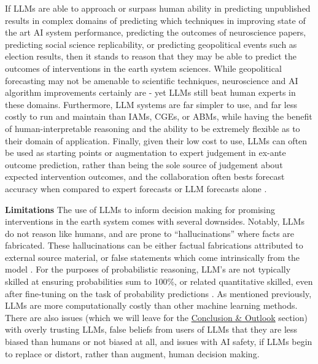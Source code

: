 \documentclass[12pt,a4paper]{article}
\begin{document}
If LLMs are able to approach or surpass human ability in predicting unpublished results in complex domains of predicting which techniques in improving state of the art AI system performance, predicting the outcomes of neuroscience papers, predicting social science replicability, or predicting geopolitical events such as election results, then it stands to reason that they may be able to predict the outcomes of interventions in the earth system sciences. While geopolitical forecasting may not be amenable to scientific techniques, neuroscience and AI algorithm improvements certainly are - yet LLMs still beat human experts in these domains. Furthermore, LLM systems are far simpler to use, and far less costly to run and maintain than IAMs, CGEs, or ABMs, while having the benefit of human-interpretable reasoning and the ability to be extremely flexible as to their domain of application. Finally, given their low cost to use, LLMs can often be used as starting points or augmentation to expert judgement in ex-ante outcome prediction, rather than being the sole source of judgement about expected intervention outcomes, and the collaboration often bests forecast accuracy when compared to expert forecasts or LLM forecasts alone  .

\textbf{Limitations}
The use of LLMs to inform decision making for promising interventions in the earth system comes with several downsides. Notably, LLMs do not reason like humans, and are prone to ``hallucinations''  where facts are fabricated. These hallucinations can be either factual fabrications attributed to external source material, or false statements which come intrinsically from the model . For the purposes of probabilistic reasoning, LLM's are not typically skilled at ensuring probabilities sum to 100\%, or related quantitative skilled, even after fine-tuning on the task of probability predictions . As mentioned previously, LLMs are more computationally costly than other machine learning methods. There are also issues (which we will leave for the \hyperref[sec:conclusion_outlook]{Conclusion \& Outlook} section) with overly trusting LLMs, false beliefs from users of LLMs that they are less biased than humans or not biased at all, and issues with AI safety, if LLMs begin to replace or distort, rather than augment, human decision making.
\end{document}
